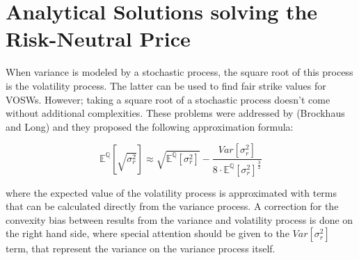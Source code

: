 
\section{Analytical Solutions solving the Risk-Neutral Price}

When variance is modeled by a stochastic process, the square root of this process is the volatility process. The latter can be used to find fair strike values for VOSWs. However; taking a square root of a stochastic process doesn't come without additional complexities. These problems were addressed by (Brockhaus and Long) and they proposed the following approximation formula:

\begin{equation}
    \mathbb{E}^\mathbb{Q}[\sqrt{\sigma_{r}^2}]\approx\sqrt{\mathbb{E}^\mathbb{Q}[\sigma_{r}^{2}]} - \frac{Var[\sigma_{r}^{2}]}{8\cdot \mathbb{E}^\mathbb{Q}[\sigma_{r}^{2}]^{\frac{3}{2}}}
    \label{eq:sqrProcess}
\end{equation}

where the expected value of the volatility process is approximated with terms that can be calculated directly from the variance process. A correction for the convexity bias between results from the variance and volatility process is done on the right hand side, where special attention should be given to the $Var[\sigma_{r}^{2}]$ term, that represent the variance on the variance process itself.\\